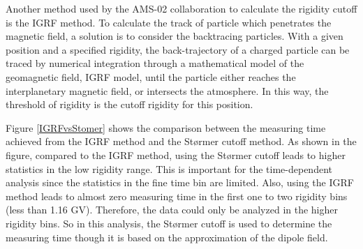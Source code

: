 Another method used by the AMS-02 collaboration to calculate the rigidity cutoff is the IGRF method. To calculate the track of particle which penetrates the magnetic field, a solution is to consider the backtracing particles. With a given position and a specified rigidity, the back-trajectory of a charged particle can be traced by numerical integration through a mathematical model of the geomagnetic field, IGRF model, until the particle either reaches the interplanetary magnetic field, or intersects the atmosphere. In this way, the threshold of rigidity is the cutoff rigidity for this position.  \par



Figure \ref{IGRFvsStomer} shows the comparison between the measuring time achieved from the IGRF method and the Størmer cutoff method. As shown in the figure, compared to the IGRF method, using the Størmer cutoff leads to higher statistics in the low rigidity range. This is important for the time-dependent analysis since the statistics in the fine time bin are limited. Also, using the IGRF method leads to almost zero measuring time in the first one to two rigidity bins (less than 1.16 GV). Therefore, the data could only be analyzed in the higher rigidity bins. So in this analysis, the Størmer cutoff is used to determine the measuring time though it is based on the approximation of the dipole field.


